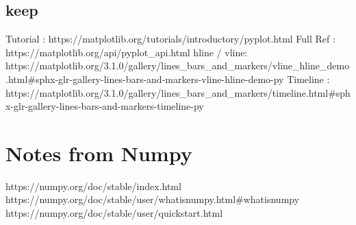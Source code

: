 \section{keep}
Tutorial     : https://matplotlib.org/tutorials/introductory/pyplot.html
Full Ref     : https://matplotlib.org/api/pyplot_api.html
hline / vline: https://matplotlib.org/3.1.0/gallery/lines_bars_and_markers/vline_hline_demo.html#sphx-glr-gallery-lines-bars-and-markers-vline-hline-demo-py
Timeline     : https://matplotlib.org/3.1.0/gallery/lines_bars_and_markers/timeline.html#sphx-glr-gallery-lines-bars-and-markers-timeline-py

\chapter{Notes from Numpy}
https://numpy.org/doc/stable/index.html
https://numpy.org/doc/stable/user/whatisnumpy.html#whatisnumpy
https://numpy.org/doc/stable/user/quickstart.html
